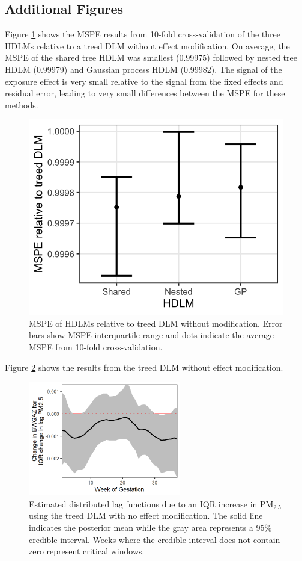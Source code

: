 \documentclass[12pt]{article}
\begin{document}
\subsection{Additional Figures}
Figure \ref{fig:mspe} shows the MSPE results from 10-fold cross-validation of the three HDLMs relative to a treed DLM without effect modification. On average, the MSPE of the shared tree HDLM was smallest (0.99975) followed by nested tree HDLM (0.99979) and Gaussian process HDLM (0.99982). The signal of the exposure effect is very small relative to the signal from the fixed effects and residual error, leading to very small differences between the MSPE for these methods.
\begin{figure}[!ht]
    \centering
    \includegraphics[width=.4\textwidth]{supp-img/mspe.png}
    \caption{MSPE of HDLMs relative to treed DLM without modification. Error bars show MSPE interquartile range and dots indicate the average MSPE from 10-fold cross-validation.}
    \label{fig:mspe}
\end{figure}

Figure \ref{fig:est_tdlm} shows the results from the treed DLM without effect modification.

\begin{figure}[!ht]
    \centering
    \includegraphics[height=5cm]{supp-img/bwgaz_tdlm.png}
    \caption{Estimated distributed lag functions due to an IQR increase in PM$_{2.5}$ using the treed DLM with no effect modification. The solid line indicates the posterior mean while the gray area represents a 95\% credible interval. Weeks where the credible interval does not contain zero represent critical windows.}
    \label{fig:est_tdlm}
\end{figure}
\end{document}
